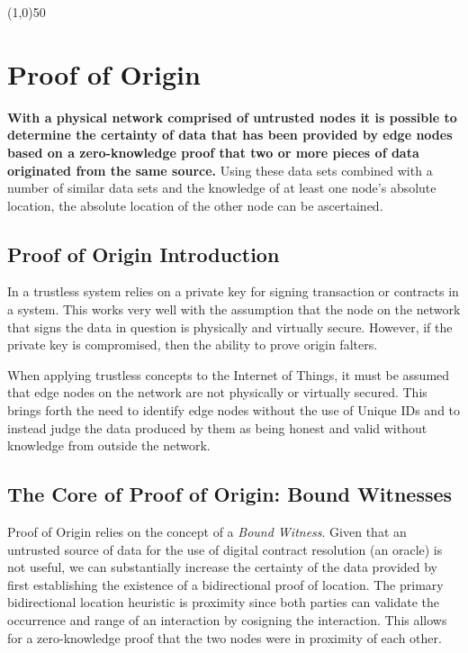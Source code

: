 \documentclass{article}
\begin{document}
\begin{center}
\line(1,0){50}
\end{center}

\section{Proof of Origin}
\textbf{With a physical network comprised of untrusted nodes it is possible to determine the certainty of data that has been provided by edge nodes based on a zero-knowledge proof that two or more pieces of data originated from the same source.} Using these data sets combined with a number of similar data sets and the knowledge of at least one node’s absolute location, the absolute location of the other node can be ascertained.

\subsection{Proof of Origin Introduction}

In a trustless system relies on a private key for signing transaction or contracts in a system. This works very well with the assumption that the node on the network that signs the data in question is physically and virtually secure. However, if the private key is compromised, then the ability to prove origin falters.

When applying trustless concepts to the Internet of Things, it must be assumed that edge nodes on the network are not physically or virtually secured. This brings forth the need to identify edge nodes without the use of Unique IDs and to instead judge the data produced by them as being honest and valid without knowledge from outside the network.

\subsection{The Core of Proof of Origin: Bound Witnesses}

Proof of Origin relies on the concept of a \textit{Bound Witness}. Given that an untrusted source of data for the use of digital contract resolution (an \gls{oracle}) is not useful, we can substantially increase the \gls{certainty} of the data provided by first establishing the existence of a bidirectional proof of location. The primary bidirectional location heuristic is proximity since both parties can validate the occurrence and range of an interaction by cosigning the interaction. This allows for a zero-knowledge proof that the two nodes were in proximity of each other.
\end{document}
